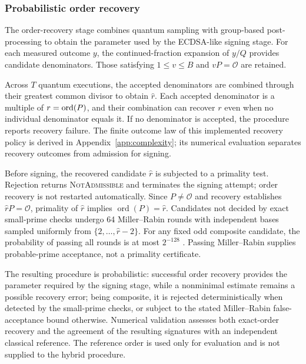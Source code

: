 \begin{revision}

\subsubsection{{Probabilistic order recovery}}

The order-recovery stage combines quantum sampling with group-based post-processing to obtain the parameter used by the ECDSA-like signing stage. For each measured outcome $y$, the continued-fraction expansion of $y/Q$ provides candidate denominators. Those satisfying $1\leq v\leq B$ and $vP=\mathcal O$ are retained.

Across $T$ quantum executions, the accepted denominators are combined through their greatest common divisor to obtain $\hat r$. Each accepted denominator is a multiple of $r=\operatorname{ord}(P)$, and their combination can recover $r$ even when no individual denominator equals it. If no denominator is accepted, the procedure reports recovery failure. The finite outcome law of this implemented recovery policy is derived in Appendix~\ref{app:complexity}; its numerical evaluation separates recovery outcomes from admission for signing.

Before signing, the recovered candidate $\hat r$ is subjected to a primality test. Rejection returns \textsc{NotAdmissible} and terminates the signing attempt; order recovery is not restarted automatically. Since $P\neq\mathcal{O}$ and recovery establishes $\hat rP=\mathcal{O}$, primality of $\hat r$ implies $\operatorname{ord}(P)=\hat r$. Candidates not decided by exact small-prime checks undergo 64 Miller--Rabin rounds with independent bases sampled uniformly from $\{2,\ldots,\hat r-2\}$. For any fixed odd composite candidate, the probability of passing all rounds is at most $2^{-128}$ \cite[Algorithm~4.24 and Fact~4.25]{Menezes1996HAC}. Passing Miller--Rabin supplies probable-prime acceptance, not a primality certificate.

The resulting procedure is probabilistic: successful order recovery provides the parameter required by the signing
stage, while a nonminimal estimate remains a possible recovery error; being composite, it is rejected deterministically when
detected by the small-prime checks, or subject to the stated
Miller--Rabin false-acceptance bound otherwise. Numerical validation assesses both exact-order recovery and the
agreement of the resulting signatures with an independent classical reference. The reference order is used only for evaluation and is not supplied to the hybrid procedure. 

\end{revision}


